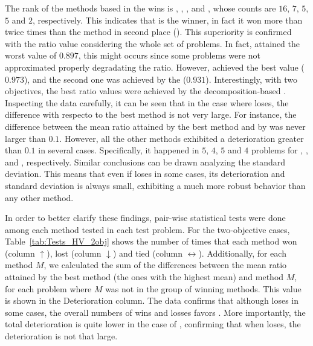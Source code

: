 The rank of the methods based in the wins is \VSDMOEAD{}, \RMOEA{}, \NSGAIII{}, \MOEADDE{} and \NSGAII{}, whose counts are $16$, $7$, $5$, $5$ and $2$, respectively.
%
This indicates that \VSDMOEAD{} is the winner, in fact it won more than twice times than the method in second place (\RMOEA{}).
%
This superiority is confirmed with the \HV{} ratio value considering the whole set of problems.
%
In fact, \RMOEA{} attained the worst value of $0.897$, this might occurs since some problems were not approximated properly degradating the \HV{} ratio.
%
However, \VSDMOEAD{} achieved the best value ($0.973$), and the second one was achieved by the \MOEADDE{} ($0.931$).
%
Interestingly, with two objectives, the best \HV{} ratio values were achieved by the decomposition-based \MOEAS{}.
%
Inspecting the data carefully, it can be seen that in the case where \VSDMOEAD{} loses, the difference with respecto to the best method is not very large.
%
For instance, the difference between the mean \HV{} ratio attained by the best method and by \VSDMOEAD{} was never larger than $0.1$.
%
However, all the other methods exhibited a deterioration greater than $0.1$ in several cases.
%
Specifically, it happened in $5$, $4$, $5$ and $4$ problems for \RMOEA{}, \NSGAII{}, \NSGAIII{} and \MOEADDE{}, respectively.
%
Similar conclusions can be drawn analyzing the standard deviation.
%
This means that even if \VSDMOEAD{} loses in some cases, its deterioration and standard deviation is always small, exhibiting a much more robust behavior than any other method.


In order to better clarify these findings, pair-wise statistical tests were done among each method tested in each test problem.
%
For the two-objective cases, Table~\ref{tab:Tests_HV_2obj} shows the number of times that each method won (column $\uparrow$), lost (column $\downarrow$) and tied (column $\leftrightarrow$).
%
Additionally, for each method $M$, we calculated the sum of the differences between the mean \HV{} ratio attained by the best method (the ones with the highest mean) and method $M$, for each problem where $M$ was not in the group of winning methods.
%
This value is shown in the Deterioration column.
%
The data confirms that although \VSDMOEAD{} loses in some cases, the overall numbers of wins and losses favors \VSDMOEAD{}.
%
More importantly, the total deterioration is quite lower in the case of \VSDMOEAD{}, confirming that when \VSDMOEAD{} loses, the deterioration is not that large.

